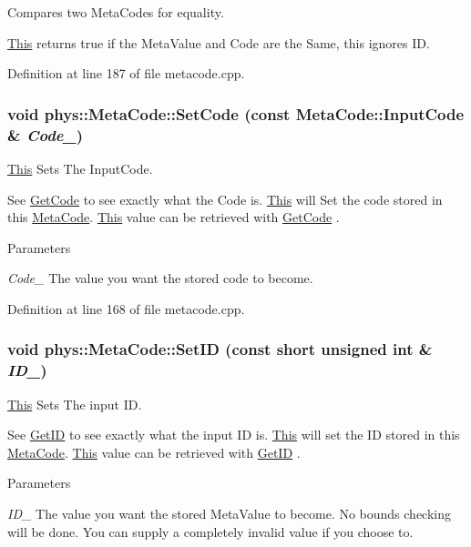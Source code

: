 Compares two MetaCodes for equality. 

\hyperlink{structThis}{This} returns true if the MetaValue and Code are the Same, this ignores ID. 

Definition at line 187 of file metacode.cpp.

\hypertarget{classphys_1_1MetaCode_ab6759fbee9d039cf248bf76dde0f33dd}{
\subsubsection[{SetCode}]{\setlength{\rightskip}{0pt plus 5cm}void phys::MetaCode::SetCode (const {\bf MetaCode::InputCode} \& {\em Code\_\-})}}
\label{da/dc9/classphys_1_1MetaCode_ab6759fbee9d039cf248bf76dde0f33dd}


\hyperlink{structThis}{This} Sets The InputCode. 

See \hyperlink{classphys_1_1MetaCode_a5835a05391cbb5a3dc83534a7bcf87d3}{GetCode} to see exactly what the Code is. \hyperlink{structThis}{This} will Set the code stored in this \hyperlink{classphys_1_1MetaCode}{MetaCode}. \hyperlink{structThis}{This} value can be retrieved with \hyperlink{classphys_1_1MetaCode_a5835a05391cbb5a3dc83534a7bcf87d3}{GetCode} . 
\begin{DoxyParams}{Parameters}
\item[{\em Code\_\-}]The value you want the stored code to become. \end{DoxyParams}


Definition at line 168 of file metacode.cpp.

\hypertarget{classphys_1_1MetaCode_a0ef70c11c06f0e3015121985cb1b6153}{
\subsubsection[{SetID}]{\setlength{\rightskip}{0pt plus 5cm}void phys::MetaCode::SetID (const short unsigned int \& {\em ID\_\-})}}
\label{da/dc9/classphys_1_1MetaCode_a0ef70c11c06f0e3015121985cb1b6153}


\hyperlink{structThis}{This} Sets The input ID. 

See \hyperlink{classphys_1_1MetaCode_a70389ebd99493248fe93c598e2fe06c9}{GetID} to see exactly what the input ID is. \hyperlink{structThis}{This} will set the ID stored in this \hyperlink{classphys_1_1MetaCode}{MetaCode}. \hyperlink{structThis}{This} value can be retrieved with \hyperlink{classphys_1_1MetaCode_a70389ebd99493248fe93c598e2fe06c9}{GetID} . 
\begin{DoxyParams}{Parameters}
\item[{\em ID\_\-}]The value you want the stored MetaValue to become. No bounds checking will be done. You can supply a completely invalid value if you choose to. \end{DoxyParams}


